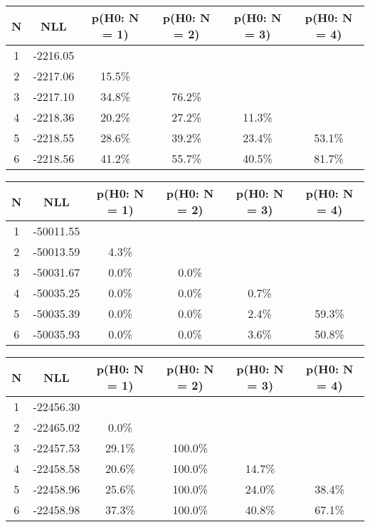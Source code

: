\begin{table}[htb]
	\begin{center}
{\footnotesize\renewcommand{\arraystretch}{1.4}
		\begin{tabular}{cc||cccc}
			N & NLL & p(H0: N = 1) & p(H0: N = 2) & p(H0: N = 3) & p(H0: N = 4)\\ 
		\hline
1 & -2216.05 & & & & \\
2 & -2217.06 & 15.5\% & & & \\
3 & -2217.10 & 34.8\% & 76.2\% & & \\
4 & -2218.36 & 20.2\% & 27.2\% & 11.3\% & \\
5 & -2218.55 & 28.6\% & 39.2\% & 23.4\% & 53.1\% \\
6 & -2218.56 & 41.2\% & 55.7\% & 40.5\% & 81.7\% \\
	\end{tabular}
		\label{tab:lab}
	}
	\end{center}\end{table}

\begin{table}[htb]
	\begin{center}
{\footnotesize\renewcommand{\arraystretch}{1.4}
		\begin{tabular}{cc||cccc}
			N & NLL & p(H0: N = 1) & p(H0: N = 2) & p(H0: N = 3) & p(H0: N = 4)\\ 
		\hline
1 & -50011.55 & & & & \\
2 & -50013.59 & 4.3\% & & & \\
3 & -50031.67 & 0.0\% & 0.0\% & & \\
4 & -50035.25 & 0.0\% & 0.0\% & 0.7\% & \\
5 & -50035.39 & 0.0\% & 0.0\% & 2.4\% & 59.3\% \\
6 & -50035.93 & 0.0\% & 0.0\% & 3.6\% & 50.8\% \\
	\end{tabular}
		\label{tab:lab}
	}
	\end{center}\end{table}

\begin{table}[htb]
	\begin{center}
{\footnotesize\renewcommand{\arraystretch}{1.4}
		\begin{tabular}{cc||cccc}
			N & NLL & p(H0: N = 1) & p(H0: N = 2) & p(H0: N = 3) & p(H0: N = 4)\\ 
		\hline
1 & -22456.30 & & & & \\
2 & -22465.02 & 0.0\% & & & \\
3 & -22457.53 & 29.1\% & 100.0\% & & \\
4 & -22458.58 & 20.6\% & 100.0\% & 14.7\% & \\
5 & -22458.96 & 25.6\% & 100.0\% & 24.0\% & 38.4\% \\
6 & -22458.98 & 37.3\% & 100.0\% & 40.8\% & 67.1\% \\
	\end{tabular}
		\label{tab:lab}
	}
	\end{center}\end{table}

